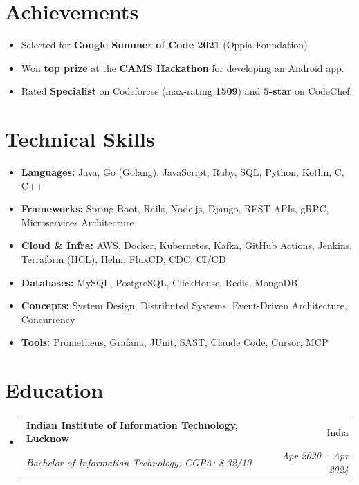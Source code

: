 \documentclass[letterpaper,10pt]{article}
\makeatletter
\newcommand{\resumeSubheading}[4]{
  \item[]
    \begin{tabular*}{0.97\textwidth}{l@{\extracolsep{\fill}}r}
      \textbf{#1} & #2 \\
      \textit{\small#3} & \textit{\small #4} \\
    \end{tabular*}
}
\newcommand{\resumeSubHeadingListStart}{\vspace{-4pt}\begin{itemize}[leftmargin=*,itemsep=5pt,parsep=0pt]}
\newcommand{\resumeSubHeadingListEnd}{\end{itemize}}
\makeatother
\begin{document}
% 

\section{Achievements}
\begin{itemize}[leftmargin=*, itemsep=1pt, parsep=0pt]
      \selectfont\small
      \item Selected for \textbf{Google Summer of Code 2021} (Oppia Foundation).
      \item Won \textbf{top prize} at the \textbf{CAMS Hackathon} for developing an Android app.
      \item Rated \textbf{Specialist} on Codeforces (max-rating \textbf{1509}) and \textbf{5-star} on CodeChef.
\end{itemize}




%
\section{Technical Skills}
\begin{itemize}[leftmargin=*, itemsep=1pt, parsep=0pt]
      \selectfont\small
      \setlength\itemsep{0em}
      \setlength\parsep{0em}
      \item \textbf{Languages:} Java, Go (Golang), JavaScript, Ruby, SQL, Python, Kotlin, C, C++
      \item \textbf{Frameworks:} Spring Boot, Rails, Node.js, Django, REST APIs, gRPC, Microservices Architecture
      \item \textbf{Cloud \& Infra:} AWS, Docker, Kubernetes, Kafka, GitHub Actions, Jenkins, Terraform (HCL), Helm, FluxCD, CDC, CI/CD
      \item \textbf{Databases:} MySQL, PostgreSQL, ClickHouse, Redis, MongoDB
      \item \textbf{Concepts:} System Design, Distributed Systems, Event-Driven Architecture, Concurrency
      \item \textbf{Tools:} Prometheus, Grafana, JUnit, SAST, Claude Code, Cursor, MCP
\end{itemize}

\section{Education}
\resumeSubHeadingListStart
\resumeSubheading
{Indian Institute of Information Technology, Lucknow}{India}
{Bachelor of Information Technology;  CGPA: 8.32/10}{Apr 2020 -- Apr 2024}
\resumeSubHeadingListEnd
\end{document}
